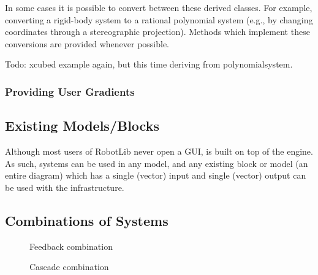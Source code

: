 In some cases it is possible to convert between these derived
classes.  For example, converting a rigid-body system to a rational
polynomial system (e.g., by changing coordinates through a
stereographic projection).  Methods which implement these conversions are
provided whenever possible.  

Todo: xcubed example again, but this time deriving from polynomialsystem.  


\subsubsection{Providing User Gradients}



\subsection{Existing \simulink Models/Blocks}\label{s:simulinksystem}

Although most users of RobotLib never open a \simulink GUI, \robotlib
is built on top of the \matlab \simulink engine.  As such, \robotlib
systems can be used in any \simulink model, and any existing \simulink
block or \simulink model (an entire \simulink diagram) which has a
single (vector) input and single (vector) output can be used with the
\robotlib infrastructure.  

\subsection{Combinations of Systems}

\begin{figure}[h]
\begin{center}
\end{center}
\caption{Feedback combination}
\end{figure}

\begin{figure}[h]
\begin{center}
\end{center}
\caption{Cascade combination}
\end{figure}

